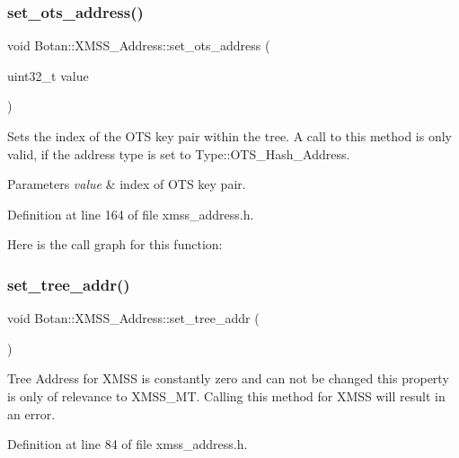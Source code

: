 \subsubsection{\texorpdfstring{set\+\_\+ots\+\_\+address()}{set\_ots\_address()}}
{\footnotesize\ttfamily void Botan\+::\+X\+M\+S\+S\+\_\+\+Address\+::set\+\_\+ots\+\_\+address (\begin{DoxyParamCaption}\item[{uint32\+\_\+t}]{value }\end{DoxyParamCaption})\hspace{0.3cm}{\ttfamily [inline]}}

Sets the index of the O\+TS key pair within the tree. A call to this method is only valid, if the address type is set to Type\+::\+O\+T\+S\+\_\+\+Hash\+\_\+\+Address.


\begin{DoxyParams}{Parameters}
{\em value} & index of O\+TS key pair. \\
\hline
\end{DoxyParams}


Definition at line 164 of file xmss\+\_\+address.\+h.

Here is the call graph for this function\+:
\mbox{\label{class_botan_1_1_x_m_s_s___address_af0c3a079be599e10d72e14223f8ea16d}} 
\subsubsection{\texorpdfstring{set\+\_\+tree\+\_\+addr()}{set\_tree\_addr()}}
{\footnotesize\ttfamily void Botan\+::\+X\+M\+S\+S\+\_\+\+Address\+::set\+\_\+tree\+\_\+addr (\begin{DoxyParamCaption}{ }\end{DoxyParamCaption})\hspace{0.3cm}{\ttfamily [inline]}}

Tree Address for X\+M\+SS is constantly zero and can not be changed this property is only of relevance to X\+M\+S\+S\+\_\+\+MT. Calling this method for X\+M\+SS will result in an error. 

Definition at line 84 of file xmss\+\_\+address.\+h.

